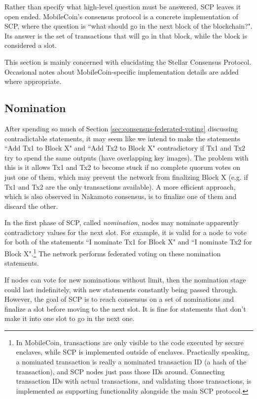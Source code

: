 Rather than specify what high-level question must be answered, SCP leaves it open ended. MobileCoin's consensus protocol is a concrete implementation of SCP, where the question is ``what should go in the next block of the blockchain?". Its answer is the set of transactions that will go in that block, while the block is considered a slot.

This section is mainly concerned with elucidating the Stellar Consensus Protocol. Occasional notes about MobileCoin-specific implementation details are added where appropriate.


\subsection{Nomination}
\label{subsec:consensus-nomination}

After spending so much of Section \ref{sec:consensus-federated-voting} discussing contradictable statements, it may seem like we intend to make the statements ``Add Tx1 to Block X" and ``Add Tx2 to Block X" contradictory if Tx1 and Tx2 try to spend the same outputs (have overlapping key images). The problem with this is it allows Tx1 and Tx2 to become stuck if no complete quorum votes on just one of them, which may prevent the network from finalizing Block X (e.g. if Tx1 and Tx2 are the only transactions available). A more efficient approach, which is also observed in Nakamoto consensus, is to finalize one of them and discard the other.

In the first phase of SCP, called {\em nomination}, nodes may nominate apparently contradictory values for the next slot. For example, it is valid for a node to vote for both of the statements ``I nominate Tx1 for Block X" and ``I nominate Tx2 for Block X".\footnote{In MobileCoin, transactions are only visible to the code executed by secure enclaves, while SCP is implemented outside of enclaves. Practically speaking, a nominated transaction is really a nominated transaction ID (a hash of the transaction), and SCP nodes just pass those IDs around. Connecting transaction IDs with actual transactions, and validating those transactions, is implemented as supporting functionality alongside the main SCP protocol.} The network performs federated voting on these nomination statements.

If nodes can vote for new nominations without limit, then the nomination stage could last indefinitely, with new statements constantly being passed through. However, the goal of SCP is to reach consensus on a set of nominations and finalize a slot before moving to the next slot. It is fine for statements that don't make it into one slot to go in the next one.

